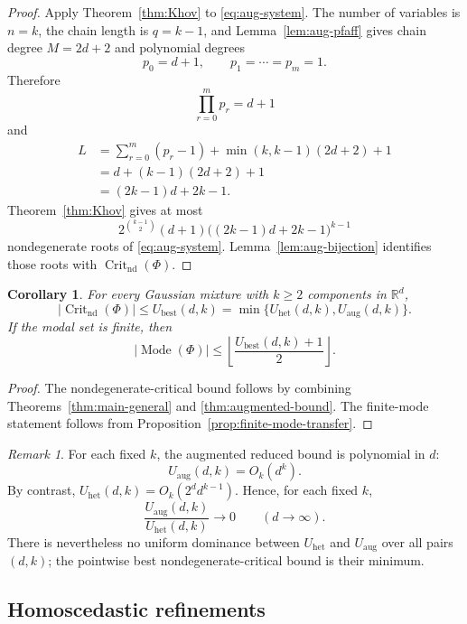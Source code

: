 \documentclass[11pt]{article}
\theoremstyle{plain}
\newtheorem{corollary}[theorem]{Corollary}
\theoremstyle{definition}
\theoremstyle{remark}
\newtheorem{remark}[theorem]{Remark}
\numberwithin{equation}{section}
\DeclareMathOperator{\Crit}{Crit}
\DeclareMathOperator{\Mode}{Mode}
\newcommand{\R}{\mathbb{R}}
\begin{document}
\begin{proof}
Apply Theorem~\ref{thm:Khov} to \eqref{eq:aug-system}. The number of variables is $n=k$, the chain length is $q=k-1$, and Lemma~\ref{lem:aug-pfaff} gives chain degree $M=2d+2$ and polynomial degrees
\[
p_0=d+1,\qquad p_1=\cdots=p_m=1.
\]
Therefore
\[
\prod_{r=0}^m p_r=d+1
\]
and
\begin{align*}
L
&=\sum_{r=0}^m(p_r-1)+\min(k,k-1)(2d+2)+1 \\
&=d+(k-1)(2d+2)+1\\
&=(2k-1)d+2k-1.
\end{align*}
Theorem~\ref{thm:Khov} gives at most
\[
2^{\binom{k-1}{2}}(d+1)\bigl((2k-1)d+2k-1\bigr)^{k-1}
\]
nondegenerate roots of \eqref{eq:aug-system}. Lemma~\ref{lem:aug-bijection} identifies those roots with $\Crit_{\mathrm{nd}}(\Phi)$.
\end{proof}

\begin{corollary}\label{cor:best-heteroscedastic-bound}
For every Gaussian mixture with $k\ge2$ components in $\R^d$,
\[
|\Crit_{\mathrm{nd}}(\Phi)|
\le
U_{\mathrm{best}}(d,k)=\min\{U_{\mathrm{het}}(d,k),U_{\mathrm{aug}}(d,k)\}.
\]
If the modal set is finite, then
\[
|\Mode(\Phi)|\le
\left\lfloor\frac{U_{\mathrm{best}}(d,k)+1}{2}\right\rfloor.
\]
\end{corollary}

\begin{proof}
The nondegenerate-critical bound follows by combining Theorems~\ref{thm:main-general} and \ref{thm:augmented-bound}. The finite-mode statement follows from Proposition~\ref{prop:finite-mode-transfer}.
\end{proof}

\begin{remark}
For each fixed $k$, the augmented reduced bound is polynomial in $d$:
\[
U_{\mathrm{aug}}(d,k)=O_k(d^k).
\]
By contrast, $U_{\mathrm{het}}(d,k)=O_k(2^d d^{k-1})$. Hence, for each fixed $k$,
\[
\frac{U_{\mathrm{aug}}(d,k)}{U_{\mathrm{het}}(d,k)}\to 0
\qquad (d\to\infty).
\]
There is nevertheless no uniform dominance between $U_{\mathrm{het}}$ and $U_{\mathrm{aug}}$ over all pairs $(d,k)$; the pointwise best nondegenerate-critical bound is their minimum.
\end{remark}

\subsection{Homoscedastic refinements}\label{subsec:homoscedastic}
\end{document}
